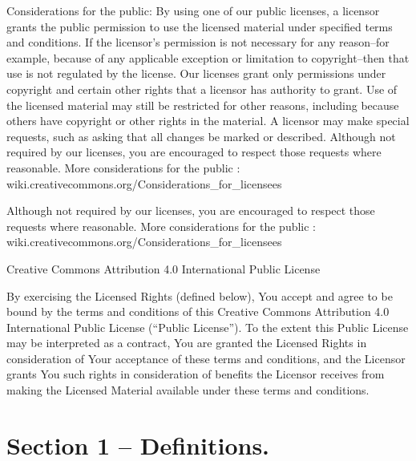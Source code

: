 \documentclass[a4paper, 12pt]{article}
\begin{document}
Considerations for the public: By using one of our public licenses, a licensor grants the public permission to use the licensed material under specified terms and conditions. If the licensor's permission is not necessary for any reason–for example, because of any applicable exception or limitation to copyright–then that use is not regulated by the license. Our licenses grant only permissions under copyright and certain other rights that a licensor has authority to grant. Use of the licensed material may still be restricted for other reasons, including because others have copyright or other rights in the material. A licensor may make special requests, such as asking that all changes be marked or described. Although not required by our licenses, you are encouraged to respect those requests where reasonable. More considerations for the public : wiki.creativecommons.org/Considerations\_for\_licensees

\vspace{0.5cm}

Although not required by our licenses, you are encouraged to respect those requests where reasonable. More considerations for the public : \\ wiki.creativecommons.org/Considerations\_for\_licensees

\vspace{0.5cm}

Creative Commons Attribution 4.0 International Public License

\vspace{0.5cm}

By exercising the Licensed Rights (defined below), You accept and agree to be bound by the terms and conditions of this Creative Commons Attribution 4.0 International Public License (``Public License''). To the extent this Public License may be interpreted as a contract, You are granted the Licensed Rights in consideration of Your acceptance of these terms and conditions, and the Licensor grants You such rights in consideration of benefits the Licensor receives from making the Licensed Material available under these terms and conditions.

\section*{Section 1 – Definitions.}
\end{document}
